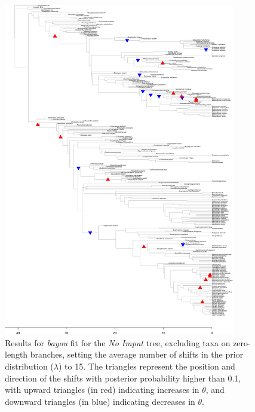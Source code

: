 \begin{figure}[H]
\includegraphics[width=0.9\textwidth]{img/plots-noimput-k15-1.pdf}
\caption{Results for \textit{bayou} fit for the \textit{No Imput} tree, excluding taxa on zero-length branches, setting the average number of shifts in the prior distribution ($\lambda$) to 15. The triangles represent the position and direction of the shifts with posterior probability higher than 0.1, with upward triangles (in red) indicating increases in $\theta$, and downward triangles (in blue) indicating decreases in $\theta$.}
\label{fig:noimput-k15-nzlb}
\end{figure}

\newpage

